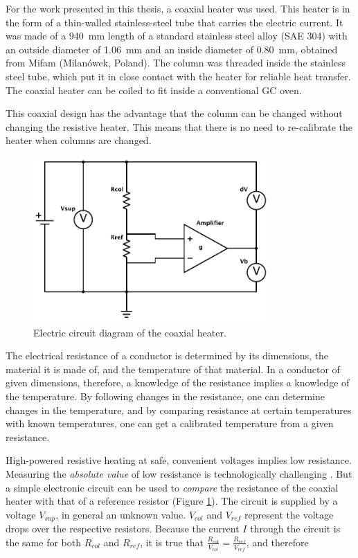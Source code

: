 For the work presented in this thesis, a coaxial heater was used. This heater is
in the form of a thin-walled stainless-steel tube that carries the electric
current. It was made of a \SI{940}{\milli\metre} length of a standard stainless
steel alloy (SAE 304) with an outside diameter of \SI{1.06}{\milli\metre} and an
inside diameter of \SI{0.80}{\milli\metre}, obtained from Mifam (Milanówek,
Poland). The column was threaded inside the stainless steel tube, which put it
in close contact with the heater for reliable heat transfer. The coaxial heater
can be coiled to fit inside a conventional GC oven.

This coaxial design has the advantage that the column can be changed without
changing the resistive heater. This means that there is no need to re-calibrate
the heater when columns are changed.

\begin{figure}[htbp]
	\centering
	\includegraphics[width=0.8\textwidth]{Figures/Column-Heater.pdf}
	\decoRule
	\caption[Coaxial heater resistance heater]{\label{fig:HeaterDiagram}Electric circuit diagram of the coaxial heater.}
\end{figure}

The electrical resistance of a conductor is determined by its dimensions, the
material it is made of, and the temperature of that material. In a conductor of
given dimensions, therefore, a knowledge of the resistance implies a knowledge
of the temperature. By following changes in the resistance, one can determine
changes in the temperature, and by comparing resistance at certain temperatures
with known temperatures, one can get a calibrated temperature from a given
resistance.

High-powered resistive heating at safe, convenient voltages implies low
resistance. Measuring the \emph{absolute value} of low resistance is
technologically challenging \autocite{Dyos2012}. But a simple electronic circuit
can be used to \emph{compare} the resistance of the coaxial heater with that of
a reference resistor (Figure \ref{fig:HeaterDiagram}). The circuit is supplied
by a voltage \(V_{sup}\), in general an unknown value. \(V_{col}\) and
\(V_{ref}\) represent the voltage drops over the respective resistors. Because
the current \(I\) through the circuit is the same for both \(R_{col}\) and
\(R_{ref}\), it is true that \(\frac{R_{col}}{V_{col}} = \frac{ R_{ref} }{
V_{ref} }\), and therefore

